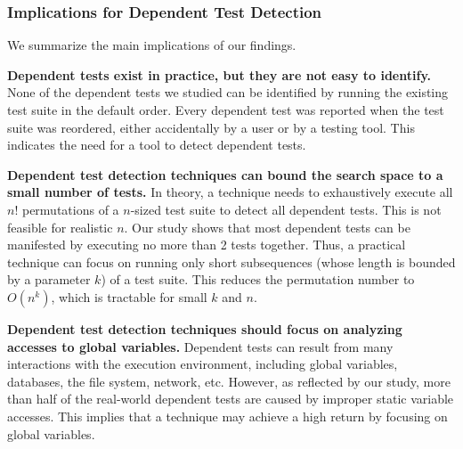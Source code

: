 

\subsubsection{Implications for Dependent Test Detection}

We summarize the main implications of our findings.

\noindent \textbf{{Dependent tests exist in practice, but
they are not easy to identify.}}
None of the dependent tests we studied can be identified by
running the existing test suite in the default order. 
Every dependent test was reported when the
test suite was reordered, either accidentally by a user or
by a testing tool. This indicates the need
for a tool to detect dependent tests.

\vspace{1mm}
\noindent \textbf{Dependent test detection techniques
can bound the search space to a small number of tests.}
In theory, a technique needs to exhaustively execute
all $n!$ permutations of a $n$-sized
test suite to detect all dependent tests. This is
not feasible for realistic $n$.  Our study shows that
most dependent tests can be manifested by executing
no more than 2 tests together. Thus, a practical technique
can focus on running only short subsequences (whose
length is bounded by a parameter $k$)
of a test suite. This reduces the permutation number 
to $O(n^k)$, which is tractable for small $k$ and $n$.

\vspace{1mm}
\noindent \textbf{Dependent test detection techniques
should focus on analyzing accesses to global variables.}
Dependent tests can result from many
interactions with the execution environment, including
global variables, databases, the file system, network, etc.
However, as reflected by our study, more than half of the
real-world dependent tests are caused
by improper static variable accesses. This implies that a technique
may achieve a high return by focusing on global variables.




